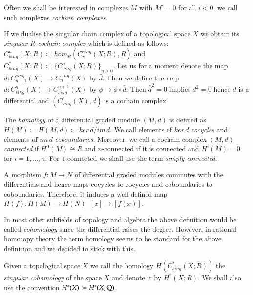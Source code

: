 Often we shall be interested in complexes $M$ with $M^i = 0$ for all $i < 0$, we call such complexes \emph{cochain complexes}.

\begin{Example}
 If we dualise the singular chain complex of a topological space $X$ we obtain its \emph{singular $R$-cochain complex} which 
 is defined as follows: \newline
 $C^n_{sing}(X;R) \coloneqq hom_R(C_n^{sing}(X;R),R)$ and
 $C^*_{sing}(X;R) \coloneqq { \lbrace C^n_{sing}(X;R) \rbrace }_{n \geq 0}$. \newline
 Let us for a moment denote  the map $d \colon C_{n+1}^{sing}(X) \to C_n^{sing}(X)$ by $\bar{d}$. Then we define the map
 $d \colon C_{sing}^n(X) \to C_{sing}^{n+1}(X)$ by $\phi \mapsto \phi \circ \bar{d}$. Then ${\bar{d}}^2 = 0$ implies $d^2 = 0$
 hence $d$ is a differential and $(C^*_{sing}(X),d)$ is a cochain complex.
\end{Example}

\begin{Definition}
The \emph{homology} of a differential graded module $(M,d)$ is defined as \newline ${H(M) \coloneqq 
H(M,d) \coloneqq ker \, d / im \, d}$.
We call elements of $ker \, d$ \emph{cocycles} and elements of $im \, d$ \emph{coboundaries}.
Moreover, we call a cochain complex $(M,d)$ \emph{connected} if $H^0(M) \cong R$ and $n$-connected if 
it is connected and $H^i(M) = 0$ for $i = 1, \dotsc, n$. For $1$-connected we shall use the term \emph{simply connected}.
\end{Definition}

A morphism $f \colon M \to N$ of differential graded modules commutes with the differentials and hence maps cocycles to cocycles
and coboundaries to coboundaries. Therefore, it induces a well defined map $H(f) \colon H(M) \to H(N) \; \; [x] \mapsto [f(x)]$. 

\begin{Remark}
 In most other subfields of topology and algebra the above definition would be called \emph{cohomology} since the
 differential raises the degree. However, in rational homotopy theory the term homology seems to be standard for the
 above definition and we decided to stick with this.
\end{Remark}

\begin{Example}
 Given a topological space $X$ we call the homology $H(C^*_{sing}(X;R))$ the \emph{singular cohomology} of the space $X$
 and denote it by $H^*(X;R)$. We shall also use the convention $H^*(X) \coloneqq H^*(X; \mathbb{Q})$.	
\end{Example}


